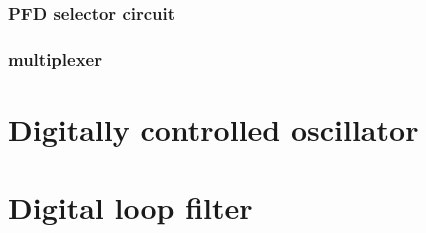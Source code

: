 \subsubsection{PFD selector circuit}

\subsubsection{multiplexer}

\section{Digitally controlled oscillator}

\section{Digital loop filter}
